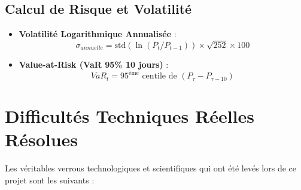 \documentclass[12pt,a4paper]{article}
\begin{document}
\subsection{Calcul de Risque et Volatilité}
\begin{itemize}
    \item \textbf{Volatilité Logarithmique Annualisée} :
    \begin{equation}
    \sigma_{annuelle} = \text{std}(\ln(P_t / P_{t-1})) \times \sqrt{252} \times 100
    \end{equation}
    \item \textbf{Value-at-Risk (VaR 95\% 10 jours)} :
    \begin{equation}
    VaR_t = 95^{\text{ème}}\text{ centile de } (P_{\tau} - P_{\tau-10})
    \end{equation}
\end{itemize}

\section{Difficultés Techniques Réelles Résolues}
Les véritables verrous technologiques et scientifiques qui ont été levés lors de ce projet sont les suivants :
\end{document}
